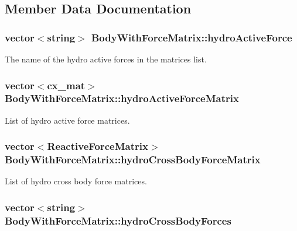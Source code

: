 \subsection{Member Data Documentation}
\hypertarget{class_body_with_force_matrix_abab87c2d9bad9c11e526aa35fbe242cb}{
\subsubsection[{hydro\-Active\-Force}]{\setlength{\rightskip}{0pt plus 5cm}vector$<$string$>$ Body\-With\-Force\-Matrix\-::hydro\-Active\-Force}}\label{class_body_with_force_matrix_abab87c2d9bad9c11e526aa35fbe242cb}
The name of the hydro active forces in the matrices list. \hypertarget{class_body_with_force_matrix_a8902e9ad82255e0794dff72725928ff9}{
\subsubsection[{hydro\-Active\-Force\-Matrix}]{\setlength{\rightskip}{0pt plus 5cm}vector$<$cx\-\_\-mat$>$ Body\-With\-Force\-Matrix\-::hydro\-Active\-Force\-Matrix}}\label{class_body_with_force_matrix_a8902e9ad82255e0794dff72725928ff9}
List of hydro active force matrices. \hypertarget{class_body_with_force_matrix_a0fe089e2b9d9bacaf38d8e2e957ee125}{
\subsubsection[{hydro\-Cross\-Body\-Force\-Matrix}]{\setlength{\rightskip}{0pt plus 5cm}vector$<${\bf Reactive\-Force\-Matrix}$>$ Body\-With\-Force\-Matrix\-::hydro\-Cross\-Body\-Force\-Matrix}}\label{class_body_with_force_matrix_a0fe089e2b9d9bacaf38d8e2e957ee125}
List of hydro cross body force matrices. \hypertarget{class_body_with_force_matrix_ae43f824670c354999843f2cc3e0987c8}{
\subsubsection[{hydro\-Cross\-Body\-Forces}]{\setlength{\rightskip}{0pt plus 5cm}vector$<$string$>$ Body\-With\-Force\-Matrix\-::hydro\-Cross\-Body\-Forces}}\label{class_body_with_force_matrix_ae43f824670c354999843f2cc3e0987c8}
